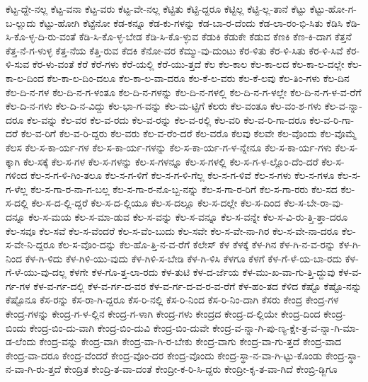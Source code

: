 {ಕೆಟ್ಟ-ದ್ದೇ-ನಲ್ಲ
ಕೆಟ್ಟ-ವನಾ
ಕೆಟ್ಟ-ವರು
ಕೆಟ್ಟ-ವೇ-ನಲ್ಲ
ಕೆಟ್ಟಿತು
ಕೆಟ್ಟಿ-ದ್ದರೂ
ಕೆಟ್ಟಿಲ್ಲ
ಕೆಟ್ಟಿ-ಲ್ಲ-ತಾನೆ
ಕೆಟ್ಟು
ಕೆಟ್ಟು-ಹೋ-ಗ-ಬ-ಲ್ಲುದು
ಕೆಟ್ಟು-ಹೋಗಿ
ಕೆಟ್ಟೆನೋ
ಕೆಡ-ಕನ್ನೂ
ಕೆಡ-ಕು-ಗಳನ್ನು
ಕೆಡ-ಬಾ-ರ-ದೆಂದು
ಕೆಡ-ಲಾ-ರಂ-ಭಿ-ಸಿತು
ಕೆಡಿಸಿ
ಕೆಡಿ-ಸಿ-ಕೊ-ಳ್ಳ-ದಿ-ರು-ವಂತೆ
ಕೆಡಿ-ಸಿ-ಕೊ-ಳ್ಳ-ಬೇಡ
ಕೆಡಿ-ಸಿ-ಕೊ-ಳ್ಳುವ
ಕೆಡುಕಿ
ಕೆಡುಕೇ
ಕೆಡುವ
ಕೆಣಕಿ
ಕೆಣ-ಕಿ-ದಾಗ
ಕೆತ್ತನೆ
ಕೆತ್ತ-ನೆ-ಗ-ಳುಳ್ಳ
ಕೆತ್ತ-ನೆಯ
ಕೆತ್ತಿ-ರುವ
ಕೆದಕಿ
ಕೆನೋ-ವರ
ಕೆಮ್ಮು-ವು-ದುಂಟು
ಕೆರ-ಳಿತು
ಕೆರ-ಳಿ-ಸಿತು
ಕೆರ-ಳಿ-ಸಿವೆ
ಕೆರ-ಳಿ-ಸುವ
ಕೆರ-ಳು-ವಂತೆ
ಕೆರೆ
ಕೆರೆ-ಗಳು
ಕೆರೆ-ಯಲ್ಲಿ
ಕೆರೆ-ಯು-ತ್ತದೆ
ಕೆಲ
ಕೆಲ-ಕಾಲ
ಕೆಲ-ಕಾ-ಲದ
ಕೆಲ-ಕಾ-ಲ-ದಲ್ಲೇ
ಕೆಲ-ಕಾ-ಲ-ದಿಂದ
ಕೆಲ-ಕಾ-ಲ-ದಿಂ-ದಲೂ
ಕೆಲ-ಕಾ-ಲ-ವಾ-ದರೂ
ಕೆಲ-ಕೆ-ಲ-ವರು
ಕೆಲ-ಕೆ-ಲವು
ಕೆಲ-ತಿಂ-ಗಳು
ಕೆಲ-ದಿನ
ಕೆಲ-ದಿ-ನ-ಗಳ
ಕೆಲ-ದಿ-ನ-ಗ-ಳಂತೂ
ಕೆಲ-ದಿ-ನ-ಗಳನ್ನು
ಕೆಲ-ದಿ-ನ-ಗಳಲ್ಲಿ
ಕೆಲ-ದಿ-ನ-ಗ-ಳಲ್ಲೇ
ಕೆಲ-ದಿ-ನ-ಗ-ಳ-ವ-ರೆಗೆ
ಕೆಲ-ದಿ-ನ-ಗಳು
ಕೆಲ-ದಿ-ನ-ವಿದ್ದು
ಕೆಲ-ಭಾ-ಗ-ವನ್ನು
ಕೆಲ-ಮ-ಟ್ಟಿಗೆ
ಕೆಲರು
ಕೆಲ-ವಂತೂ
ಕೆಲ-ವಂ-ಶ-ಗಳು
ಕೆಲ-ವ-ನ್ನಾ-ದರೂ
ಕೆಲ-ವನ್ನು
ಕೆಲ-ವರ
ಕೆಲ-ವ-ರದು
ಕೆಲ-ವ-ರನ್ನು
ಕೆಲ-ವ-ರಲ್ಲಿ
ಕೆಲ-ವರಿ
ಕೆಲ-ವ-ರಿ-ಗಾ-ದರೂ
ಕೆಲ-ವ-ರಿ-ಗಾ-ದರೆ
ಕೆಲ-ವ-ರಿಗೆ
ಕೆಲ-ವ-ರಿ-ದ್ದರು
ಕೆಲ-ವರು
ಕೆಲ-ವ-ರೆಂ-ದರೆ
ಕೆಲ-ವರೊ
ಕೆಲವು
ಕೆಲವೇ
ಕೆಲ-ವೊಂದು
ಕೆಲ-ವೊಮ್ಮೆ
ಕೆಲಸ
ಕೆಲ-ಸ-ಕಾ-ರ್ಯ-ಗಳ
ಕೆಲ-ಸ-ಕಾ-ರ್ಯ-ಗಳನ್ನು
ಕೆಲ-ಸ-ಕಾ-ರ್ಯ-ಗ-ಳ-ನ್ನೇನೂ
ಕೆಲ-ಸ-ಕಾ-ರ್ಯ-ಗಳು
ಕೆಲ-ಸ-ಕ್ಕಾಗಿ
ಕೆಲ-ಸಕ್ಕೆ
ಕೆಲ-ಸ-ಗಳ
ಕೆಲ-ಸ-ಗಳನ್ನು
ಕೆಲ-ಸ-ಗಳನ್ನೂ
ಕೆಲ-ಸ-ಗಳಲ್ಲಿ
ಕೆಲ-ಸ-ಗ-ಳ-ಲ್ಲೊಂ-ದೆಂ-ದರೆ
ಕೆಲ-ಸ-ಗಳಿಂದ
ಕೆಲ-ಸ-ಗ-ಳಿ-ಗಿಂ-ತಲೂ
ಕೆಲ-ಸ-ಗ-ಳಿಗೆ
ಕೆಲ-ಸ-ಗ-ಳಿ-ಗೆಲ್ಲ
ಕೆಲ-ಸ-ಗ-ಳಿವೆ
ಕೆಲ-ಸ-ಗಳು
ಕೆಲ-ಸ-ಗಳೂ
ಕೆಲ-ಸ-ಗ-ಳೆಲ್ಲ
ಕೆಲ-ಸ-ಗಾ-ರ-ನಾ-ಗ-ಬಲ್ಲ
ಕೆಲ-ಸ-ಗಾ-ರ-ನೊ-ಬ್ಬ-ನನ್ನು
ಕೆಲ-ಸ-ಗಾ-ರ-ರಿಗೆ
ಕೆಲ-ಸ-ಗಾ-ರರು
ಕೆಲ-ಸದ
ಕೆಲ-ಸ-ದಲ್ಲಿ
ಕೆಲ-ಸ-ದ-ಲ್ಲಿ-ದ್ದರೆ
ಕೆಲ-ಸ-ದ-ಲ್ಲಿಯೂ
ಕೆಲ-ಸ-ದಲ್ಲೂ
ಕೆಲ-ಸ-ದಲ್ಲೇ
ಕೆಲ-ಸ-ದಿಂದ
ಕೆಲ-ಸ-ಬೇ-ರಾ-ವು-ದನ್ನೂ
ಕೆಲ-ಸ-ಮಯ
ಕೆಲ-ಸ-ಮಾ-ಡುವ
ಕೆಲ-ಸ-ವನ್ನು
ಕೆಲ-ಸ-ವನ್ನೂ
ಕೆಲ-ಸ-ವನ್ನೇ
ಕೆಲ-ಸ-ವಿ-ರು-ತ್ತಿ-ತ್ತಾ-ದರೂ
ಕೆಲ-ಸವೂ
ಕೆಲ-ಸವೆ
ಕೆಲ-ಸ-ವೆಂದರೆ
ಕೆಲ-ಸ-ವೆಂ-ಬುದು
ಕೆಲ-ಸವೇ
ಕೆಲ-ಸ-ವೇ-ನಾ-ಗಿರ
ಕೆಲ-ಸ-ವೇ-ನಾ-ದರೂ
ಕೆಲ-ಸ-ವೇ-ನಿ-ದ್ದರೂ
ಕೆಲ-ಸ-ವೊಂ-ದನ್ನು
ಕೆಲ-ಹೊ-ತ್ತಿ-ನ-ವ-ರೆಗೆ
ಕೆಲೇಸ್
ಕೆಳ
ಕೆಳಕ್ಕೆ
ಕೆಳ-ಗಿನ
ಕೆಳ-ಗಿ-ನ-ವ-ರನ್ನು
ಕೆಳ-ಗಿ-ನಿಂದ
ಕೆಳ-ಗಿ-ಳಿದು
ಕೆಳ-ಗಿಳಿ-ಯು-ವುದು
ಕೆಳ-ಗಿಳಿ-ಸ-ಬೇಡಿ
ಕೆಳ-ಗಿ-ಳಿಸಿ
ಕೆಳಗೂ
ಕೆಳಗೆ
ಕೆಳ-ಗೆ-ಳೆ-ಯ-ಬಾ-ರದು
ಕೆಳ-ಗೆ-ಳೆ-ಯು-ವು-ದಲ್ಲ
ಕೆಳಗೇ
ಕೆಳ-ಗೊ-ತ್ತ-ಲಾ-ರದು
ಕೆಳ-ತುಟಿ
ಕೆಳ-ದ-ರ್ಜೆಯ
ಕೆಳ-ಮು-ಖ-ವಾ-ಗು-ತ್ತಿ-ದ್ದುವು
ಕೆಳ-ವ-ರ್ಗ-ಗಳ
ಕೆಳ-ವ-ರ್ಗ-ದಲ್ಲಿ
ಕೆಳ-ವ-ರ್ಗ-ದ-ವರ
ಕೆಳ-ವ-ರ್ಗ-ದ-ವ-ರ-ವ-ರೆಗೆ
ಕೆಳ-ಹಂ-ತದ
ಕೆಳಿದ
ಕೆಷ್ಟೊ
ಕೆಷ್ಟೊ-ನನ್ನು
ಕೆಷ್ಟೊನೂ
ಕೆಸ-ರನ್ನು
ಕೆಸ-ರಾ-ಗಿ-ದ್ದರೂ
ಕೆಸ-ರಿ-ನಲ್ಲಿ
ಕೆಸ-ರಿ-ನಿಂದ
ಕೆಸ-ರಿ-ನಿಂ-ದಾಗಿ
ಕೆಸರು
ಕೇಂದ್ರ
ಕೇಂದ್ರ-ಗಳ
ಕೇಂದ್ರ-ಗಳನ್ನು
ಕೇಂದ್ರ-ಗ-ಳ-ಲ್ಲಿನ
ಕೇಂದ್ರ-ಗ-ಳಾಗಿ
ಕೇಂದ್ರ-ಗಳು
ಕೇಂದ್ರದ
ಕೇಂದ್ರ-ದ-ಲ್ಲಿಯೇ
ಕೇಂದ್ರ-ದಿಂದ
ಕೇಂದ್ರ-ಬಿಂದು
ಕೇಂದ್ರ-ಬಿಂ-ದು-ವಾಗಿ
ಕೇಂದ್ರ-ಬಿಂ-ದುವಿ
ಕೇಂದ್ರ-ಬಿಂ-ದುವೇ
ಕೇಂದ್ರ-ವ-ನ್ನಾ-ಗಿ-ಪು-ಣ್ಯ-ಕ್ಷೇ-ತ್ರ-ವ-ನ್ನಾ-ಗಿ-ಮಾ-ಡ-ಲೆಂದು
ಕೇಂದ್ರ-ವನ್ನು
ಕೇಂದ್ರ-ವಾಗಿ
ಕೇಂದ್ರ-ವಾ-ಗಿ-ರ-ಬೇಕು
ಕೇಂದ್ರ-ವಾಗು
ಕೇಂದ್ರ-ವಾ-ಗು-ತ್ತದೆ
ಕೇಂದ್ರ-ವಾದ
ಕೇಂದ್ರ-ವಾ-ದರೂ
ಕೇಂದ್ರ-ವೆಂದರೆ
ಕೇಂದ್ರ-ವೊಂ-ದರ
ಕೇಂದ್ರ-ವೊಂದು
ಕೇಂದ್ರ-ಸ್ಥಾ-ನ-ವಾ-ಗಿ-ಟ್ಟು-ಕೊಂಡು
ಕೇಂದ್ರ-ಸ್ಥಾ-ನ-ವಾ-ಗಿ-ರು-ತ್ತದೆ
ಕೇಂದ್ರಿತ
ಕೇಂದ್ರಿ-ತ-ವಾ-ದಂತೆ
ಕೇಂದ್ರೀ-ಕ-ರಿ-ಸಿ-ದ್ದರು
ಕೇಂದ್ರೀ-ಕೃ-ತ-ವಾ-ಗಿದೆ
ಕೇಂಬ್ರಿ-ಡ್ಜಿಗೂ
}
